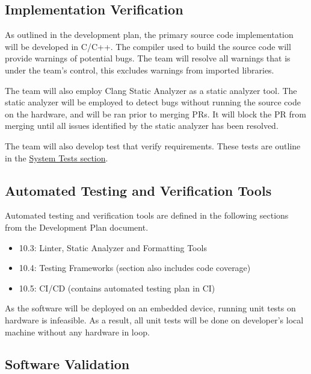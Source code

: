 \documentclass[12pt, titlepage]{article}
\begin{document}
\subsection{Implementation Verification}\label{sec:implementation_verification}

As outlined in the development plan, the primary source code implementation will
be developed in C/C++. The compiler used to build the source code will provide
warnings of potential bugs. The team will resolve all warnings that is under the
team's control, this excludes warnings from imported libraries. \newline

The team will also employ Clang Static Analyzer \cite{clangStaticAnalyzer} as a
static analyzer tool. The static analyzer will be employed to detect bugs
without running the source code on the hardware, and will be ran prior to
merging PRs. It will block the PR from merging until all issues identified by
the static analyzer has been resolved.

The team will also develop test that verify requirements. These tests are
outline in the \hyperref[sec:system_tests]{System Tests section}.

\subsection{Automated Testing and Verification Tools}
\label{sec:testing_tools}

Automated testing and verification tools are defined in the following sections
from the Development Plan document.

\begin{itemize}
  \item 10.3: Linter, Static Analyzer and Formatting Tools
  \item 10.4: Testing Frameworks (section also includes code coverage)
  \item 10.5: CI/CD (contains automated testing plan in CI)
\end{itemize}

As the software will be deployed on an embedded device, running unit tests on
hardware is infeasible. As a result, all unit tests will be done on developer's
local machine without any hardware in loop.

\subsection{Software Validation}\label{sec:software_validation}
\end{document}
